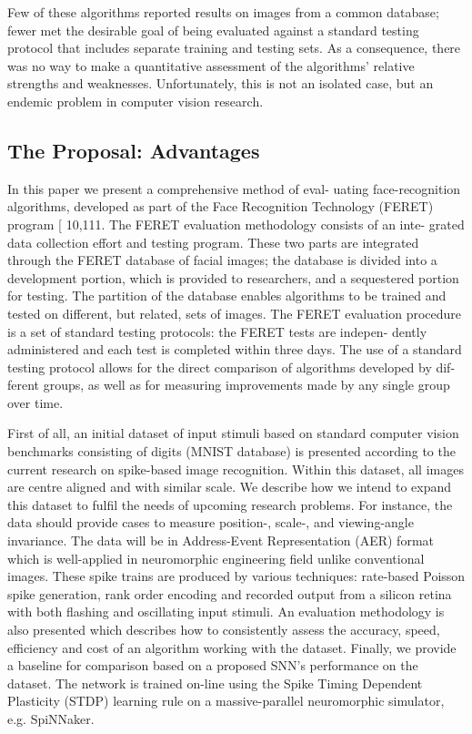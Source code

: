 Few of these algorithms reported results on images from a common database; fewer met the desirable goal of being evaluated against a standard testing protocol that includes separate training and testing sets.
As a consequence, there was no way to make a quantitative assessment of the algorithms' relative strengths and weaknesses.
Unfortunately, this is not an isolated case, but an endemic problem in computer vision research.



\subsection{The Proposal: Advantages}
In this paper we present a comprehensive method of eval-
uating face-recognition
algorithms, developed as part of the
Face Recognition Technology (FERET) program [ 10,111.
The FERET evaluation methodology consists of an inte-
grated data collection effort and testing program. These
two parts are integrated through the FERET database of
facial images; the database is divided into a development
portion, which is provided to researchers, and a sequestered
portion for testing. The partition of the database enables
algorithms to be trained and tested on different, but related,
sets of images. The FERET evaluation procedure is a set of
standard testing protocols: the FERET tests are indepen-
dently administered
and each test is completed within
three days. The use of a standard testing protocol allows
for the direct comparison of algorithms developed by dif-
ferent groups, as well as for measuring improvements made
by any single group over time.

First of all, an initial dataset of input stimuli based on standard computer vision benchmarks consisting of %
digits (MNIST database) is presented according to the current research on spike-based image recognition.
Within this dataset, all images are centre aligned and with similar scale.
We describe how we intend to expand this dataset to fulfil the needs of upcoming research problems.
For instance, the data should provide cases to measure position-, scale-, and viewing-angle invariance.
The data will be in Address-Event Representation (AER) format which is well-applied in neuromorphic engineering field unlike conventional images.
These spike trains are produced by various techniques: rate-based Poisson spike generation, rank order encoding and recorded output from a silicon retina with both flashing and oscillating input stimuli.
An evaluation methodology is also presented which describes how to consistently assess the accuracy, speed, efficiency and cost of an algorithm working with the dataset.
Finally, we provide a baseline for comparison based on a proposed SNN's performance on the dataset.
The network is trained on-line using the Spike Timing Dependent Plasticity (STDP) learning rule on a massive-parallel neuromorphic simulator, e.g. SpiNNaker.